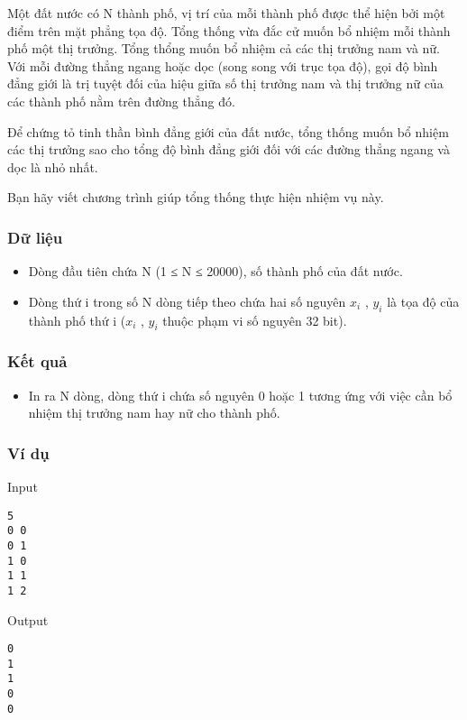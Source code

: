 

Một đất nước có N thành phố, vị trí của mỗi thành phố được thể hiện bởi một điểm trên mặt phẳng tọa độ. Tổng thống vừa đắc cử muốn bổ nhiệm mỗi thành phố một thị trưởng. Tổng thổng muốn bổ nhiệm cả các thị trưởng nam và nữ. Với mỗi đường thẳng ngang hoặc dọc (song song với trục tọa độ), gọi độ bình đẳng giới là trị tuyệt đối của hiệu giữa số thị trưởng nam và thị trưởng nữ của các thành phố nằm trên đường thẳng đó.

Để chứng tỏ tinh thần bình đẳng giới của đất nước, tổng thống muốn bổ nhiệm các thị trưởng sao cho tổng độ bình đẳng giới đối với các đường thẳng ngang và dọc là nhỏ nhất.

Bạn hãy viết chương trình giúp tổng thống thực hiện nhiệm vụ này.

\subsubsection{Dữ liệu}
\begin{itemize}
	\item Dòng đầu tiên chứa N (1 ≤ N ≤ 20000), số thành phố của đất nước.
	\item Dòng thứ i trong số N dòng tiếp theo chứa hai số nguyên $x_{i}$ , $y_{i}$ là tọa độ của thành phố thứ i ($x_{i}$ , $y_{i}$ thuộc phạm vi số nguyên 32 bit).
\end{itemize}

\subsubsection{Kết quả}
\begin{itemize}
	\item In ra N dòng, dòng thứ i chứa số nguyên 0 hoặc 1 tương ứng với việc cần bổ nhiệm thị trưởng nam hay nữ cho thành phố.
\end{itemize}

\subsubsection{Ví dụ}

Input
\begin{verbatim}
5
0 0
0 1
1 0
1 1
1 2\end{verbatim}

Output
\begin{verbatim}
0
1
1
0
0\end{verbatim}
